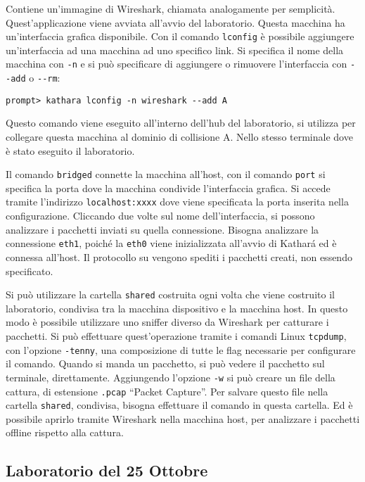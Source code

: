 \documentclass{article}
\numberwithin{equation}{subsection}
\begin{document}
Contiene un'immagine di Wireshark, chiamata analogamente per semplicità. Quest'applicazione viene avviata all'avvio del laboratorio. Questa macchina ha un'interfaccia grafica 
disponibile. Con il comando \verb|lconfig| è possibile aggiungere un'interfaccia ad una macchina ad uno specifico link. Si specifica il nome della macchina con \verb|-n| e 
si può specificare di aggiungere o rimuovere l'interfaccia con \verb|--add| o \verb|--rm|:
\begin{verbatim}
prompt> kathara lconfig -n wireshark --add A
\end{verbatim}
Questo comando viene eseguito all'interno dell'hub del laboratorio, si utilizza per collegare questa macchina al dominio di collisione A. Nello stesso terminale dove 
è stato eseguito il laboratorio. 


Il comando \verb|bridged| connette la macchina all'host, con il comando \verb|port| si specifica la porta dove la macchina condivide l'interfaccia grafica. Si 
accede tramite l'indirizzo \verb|localhost:xxxx| dove viene specificata la porta inserita nella configurazione. 
Cliccando due volte sul nome dell'interfaccia, si possono analizzare i pacchetti inviati su quella connessione. Bisogna analizzare la connessione \verb|eth1|, poiché la 
\verb|eth0| viene inizializzata all'avvio di Kathar\'{a} ed è connessa all'host. 
Il protocollo su vengono spediti i pacchetti creati, non essendo specificato. 


Si può utilizzare la cartella \verb|shared| costruita ogni volta che viene costruito il laboratorio, condivisa tra la macchina dispositivo e la macchina host. In 
questo modo è possibile utilizzare uno sniffer diverso da Wireshark per catturare i pacchetti. Si può effettuare quest'operazione tramite i comandi Linux \verb|tcpdump|, 
con l'opzione \verb|-tenny|, una composizione di tutte le flag necessarie per configurare il comando. Quando si manda un pacchetto, si può vedere il pacchetto sul terminale, 
direttamente. Aggiungendo l'opzione \verb|-w| si può creare un file della cattura, di estensione \verb|.pcap| ``Packet Capture''. Per salvare questo file nella cartella 
\verb|shared|, condivisa, bisogna effettuare il comando in questa cartella. Ed è possibile aprirlo tramite Wireshark nella macchina host, per analizzare i pacchetti 
offline rispetto alla cattura. 

\subsection{Laboratorio del 25 Ottobre}
\end{document}
